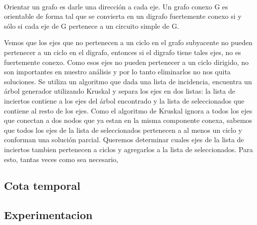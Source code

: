\\
\par
Orientar un grafo es darle una dirección a cada eje. Un grafo conexo G es orientable de forma tal que se convierta en un digrafo fuertemente conexo si y sólo si cada eje de G pertenece a un circuito simple de G.
\\
\par
Vemos que los ejes que no pertenecen a un ciclo en el grafo subyacente no pueden pertenecer a un ciclo en el digrafo, entonces si el digrafo tiene tales ejes, no es fuertemente conexo. Como esos ejes no pueden pertenecer a un ciclo dirigido, no son importantes en nuestro análisis y por lo tanto eliminarlos no nos quita soluciones. Se utiliza un algoritmo que dada una lista de incidencia, encuentra un árbol generador utilizando Kruskal y separa los ejes en dos listas: la lista de inciertos contiene a los ejes del árbol encontrado y la lista de seleccionados que contiene al resto de los ejes. Como el algoritmo de Kruskal ignora a todos los ejes que conectan a dos nodos que ya estan en la misma componente conexa, sabemos que todos los ejes de la lista de seleccionados pertenecen a al menos un ciclo y conforman una solución parcial. Queremos determinar cuales ejes de la lista de inciertos tambien pertenecen a ciclos y agregarlos a la lista de seleccionados. Para esto, tantas veces como sea necesario, 
\subsection{Cota temporal}

\subsection{Experimentacion}

\pagebreak



 




